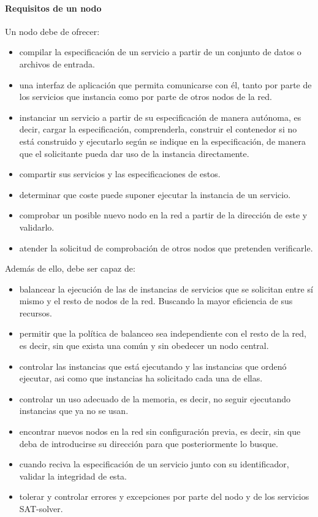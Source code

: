 \documentclass[11pt]{article}
\begin{document}
		\paragraph{Requisitos de un nodo}
			Un nodo debe de ofrecer:
			\begin{itemize}
				\item compilar la especificación de un servicio a partir de un conjunto de datos o archivos de entrada.
				\item una interfaz de aplicación que permita comunicarse con él, tanto por parte de los servicios que instancia como por parte de otros nodos de la red.
				\item instanciar un servicio a partir de su especificación de manera autónoma, es decir, cargar la especificación, comprenderla, construir el contenedor si no está
					construido y ejecutarlo según se indique en la especificación, de manera que el solicitante pueda dar uso de la instancia directamente.
				\item compartir sus servicios y las especificaciones de estos.
				\item determinar que coste puede suponer ejecutar la instancia de un servicio.
				\item comprobar un posible nuevo nodo en la red a partir de la dirección de este y validarlo.
				\item atender la solicitud de comprobación de otros nodos que pretenden verificarle.
			\end{itemize}
			Además de ello, debe ser capaz de:
			\begin{itemize}
				\item balancear la ejecución de las de instancias de servicios que se solicitan entre sí mismo y el resto de nodos de la red. Buscando la mayor eficiencia de sus recursos.
				\item permitir que la política de balanceo sea independiente con el resto de la red, es decir, sin que exista una común y sin obedecer un nodo central.
				\item controlar las instancias que está ejecutando y las instancias que ordenó ejecutar, asi como que instancias ha solicitado cada una de ellas.
				\item controlar un uso adecuado de la memoria, es decir, no seguir ejecutando instancias que ya no se usan.
				\item encontrar nuevos nodos en la red sin configuración previa, es decir, sin que deba de introducirse su dirección para que posteriormente lo busque.
				\item cuando reciva la especificación de un servicio junto con su identificador, validar la integridad de esta.
				\item tolerar y controlar errores y excepciones por parte del nodo y de los servicios SAT-solver.
			\end{itemize}
		
\end{document}
